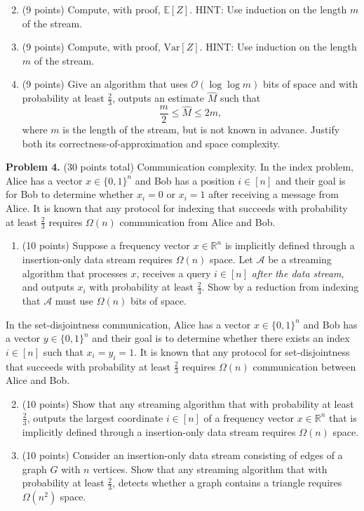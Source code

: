 \documentclass[11pt]{article}
\newcommand{\Ex}[1]{\ensuremath{\mathbb{E}\left[#1\right]}}
\newcommand{\Var}[1]{\ensuremath{\text{Var}\left[#1\right]}}
\begin{document}
\begin{enumerate}
\setcounter{enumi}{1}
\item (9 points)
Compute, with proof, $\Ex{Z}$. 
\vskip 0.1in\noindent
HINT: Use induction on the length $m$ of the stream. 
\item (9 points)
Compute, with proof, $\Var{Z}$. 
\vskip 0.1in\noindent
HINT: Use induction on the length $m$ of the stream. 
\item (9 points)
Give an algorithm that uses $\mathcal{O}(\log\log m)$ bits of space and with probability at least $\frac{2}{3}$, outputs an estimate $\widehat{M}$ such that
\[\frac{m}{2}\le\widehat{M}\le 2m,\]
where $m$ is the length of the stream, but is not known in advance. 
Justify both its correctness-of-approximation and space complexity. 
\end{enumerate}

\vskip 0.2in\noindent
\textbf{Problem 4.} (30 points total)
Communication complexity.
\vskip 0.1in\noindent
In the index problem, Alice has a vector $x\in\{0,1\}^n$ and Bob has a position $i\in[n]$ and their goal is for Bob to determine whether $x_i=0$ or $x_i=1$ after receiving a message from Alice. 
It is known that any protocol for indexing that succeeds with probability at least $\frac{2}{3}$ requires $\Omega(n)$ communication from Alice and Bob.
\begin{enumerate}
\item (10 points)
Suppose a frequency vector $x\in\mathbb{R}^n$ is implicitly defined through a insertion-only data stream requires $\Omega(n)$ space. 
Let $\mathcal{A}$ be a streaming algorithm that processes $x$, receives a query $i\in[n]$ \emph{after the data stream}, and outputs $x_i$ with probability at least $\frac{2}{3}$. 
Show by a reduction from indexing that $\mathcal{A}$ must use $\Omega(n)$ bits of space. 
\end{enumerate}
\vskip 0.1in\noindent
In the set-disjointness communication, Alice has a vector $x\in\{0,1\}^n$ and Bob has a vector $y\in\{0,1\}^n$ and their goal is to determine whether there exists an index $i\in[n]$ such that $x_i=y_i=1$. 
It is known that any protocol for set-disjointness that succeeds with probability at least $\frac{2}{3}$ requires $\Omega(n)$ communication between Alice and Bob.
\vskip 0.1in\noindent
\begin{enumerate}
\setcounter{enumi}{1}
\item (10 points)
Show that any streaming algorithm that with probability at least $\frac{2}{3}$, outputs the largest coordinate $i\in[n]$ of a frequency vector $x\in\mathbb{R}^n$ that is implicitly defined through a insertion-only data stream requires $\Omega(n)$ space. 
\item (10 points)
Consider an insertion-only data stream consisting of edges of a graph $G$ with $n$ vertices. 
Show that any streaming algorithm that with probability at least $\frac{2}{3}$, detects whether a graph contains a triangle requires $\Omega(n^2)$ space.
\end{enumerate}
\end{document}
